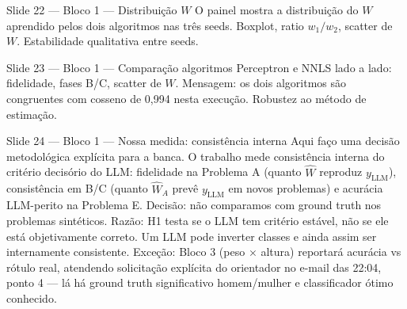 \documentclass[aspectratio=169,10pt]{beamer}
\begin{document}
\begin{frame}{Slide 22 --- Bloco 1 --- Distribui\c{c}\~ao $W$}
\footnotesize
O painel mostra a distribui\c{c}\~ao do $W$ aprendido pelos dois algoritmos nas tr\^es seeds. Boxplot, ratio $w_1/w_2$, scatter de $W$. Estabilidade qualitativa entre seeds.
\end{frame}

\begin{frame}{Slide 23 --- Bloco 1 --- Compara\c{c}\~ao algoritmos}
\footnotesize
Perceptron e NNLS lado a lado: fidelidade, fases B/C, scatter de $W$. Mensagem: os dois algoritmos s\~ao congruentes com cosseno de 0{,}994 nesta execu\c{c}\~ao. Robustez ao m\'etodo de estima\c{c}\~ao.
\end{frame}

\begin{frame}{Slide 24 --- Bloco 1 --- Nossa medida: consist\^encia interna}
\footnotesize
Aqui fa\c{c}o uma decis\~ao metodol\'ogica expl\'icita para a banca. O trabalho mede consist\^encia interna do crit\'erio decis\'orio do LLM: fidelidade na Problema A (quanto $\hat W$ reproduz $y_{\text{LLM}}$), consist\^encia em B/C (quanto $\hat W_A$ prev\^e $y_{\text{LLM}}$ em novos problemas) e acur\'acia LLM-perito na Problema E. Decis\~ao: n\~ao comparamos com ground truth nos problemas sint\'eticos. Raz\~ao: H1 testa se o LLM tem crit\'erio est\'avel, n\~ao se ele est\'a objetivamente correto. Um LLM pode inverter classes e ainda assim ser internamente consistente. Exce\c{c}\~ao: Bloco 3 (peso $\times$ altura) reportar\'a acur\'acia vs r\'otulo real, atendendo solicita\c{c}\~ao expl\'icita do orientador no e-mail das 22:04, ponto 4 --- l\'a h\'a ground truth significativo homem/mulher e classificador \'otimo conhecido.
\end{frame}
\end{document}
